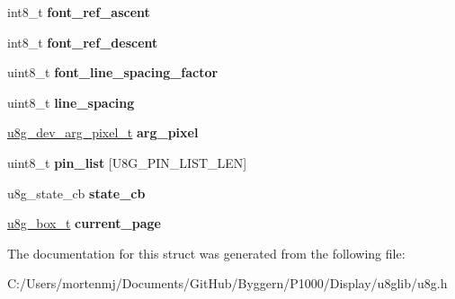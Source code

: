 \begin{DoxyCompactItemize}
\item 
\hypertarget{struct__u8g__t_a7ed41ea3f00f1aacd839d1b5c438b612}{int8\-\_\-t {\bfseries font\-\_\-ref\-\_\-ascent}}\label{struct__u8g__t_a7ed41ea3f00f1aacd839d1b5c438b612}

\item 
\hypertarget{struct__u8g__t_a762ab95e5aa4e3b695646014df488352}{int8\-\_\-t {\bfseries font\-\_\-ref\-\_\-descent}}\label{struct__u8g__t_a762ab95e5aa4e3b695646014df488352}

\item 
\hypertarget{struct__u8g__t_a2dbacf311e8c059155b54cb84c7b8452}{uint8\-\_\-t {\bfseries font\-\_\-line\-\_\-spacing\-\_\-factor}}\label{struct__u8g__t_a2dbacf311e8c059155b54cb84c7b8452}

\item 
\hypertarget{struct__u8g__t_af226d204b2dba270da8c52b6b69ec8fa}{uint8\-\_\-t {\bfseries line\-\_\-spacing}}\label{struct__u8g__t_af226d204b2dba270da8c52b6b69ec8fa}

\item 
\hypertarget{struct__u8g__t_a143e7c3dc9a84f2f46e9130bf7938f90}{\hyperlink{struct__u8g__dev__arg__pixel__t}{u8g\-\_\-dev\-\_\-arg\-\_\-pixel\-\_\-t} {\bfseries arg\-\_\-pixel}}\label{struct__u8g__t_a143e7c3dc9a84f2f46e9130bf7938f90}

\item 
\hypertarget{struct__u8g__t_aadabb4695948a9b917a99bab17ae8c8a}{uint8\-\_\-t {\bfseries pin\-\_\-list} \mbox{[}U8\-G\-\_\-\-P\-I\-N\-\_\-\-L\-I\-S\-T\-\_\-\-L\-E\-N\mbox{]}}\label{struct__u8g__t_aadabb4695948a9b917a99bab17ae8c8a}

\item 
\hypertarget{struct__u8g__t_a1a1766bbab12e45e98a4c2b89c3733c9}{u8g\-\_\-state\-\_\-cb {\bfseries state\-\_\-cb}}\label{struct__u8g__t_a1a1766bbab12e45e98a4c2b89c3733c9}

\item 
\hypertarget{struct__u8g__t_a84b273fb55a14455615a634df97bebef}{\hyperlink{struct__u8g__box__t}{u8g\-\_\-box\-\_\-t} {\bfseries current\-\_\-page}}\label{struct__u8g__t_a84b273fb55a14455615a634df97bebef}

\end{DoxyCompactItemize}


The documentation for this struct was generated from the following file\-:\begin{DoxyCompactItemize}
\item 
C\-:/\-Users/mortenmj/\-Documents/\-Git\-Hub/\-Byggern/\-P1000/\-Display/u8glib/u8g.\-h\end{DoxyCompactItemize}
